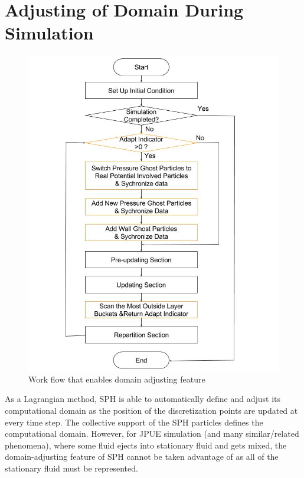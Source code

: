 \documentclass[conference,compsoc]{IEEEtran}
\begin{document}
\section{Adjusting of Domain During Simulation}
\begin{figure}[!t]
\centering
\includegraphics[scale=0.32]{Work_flow_adjust}
\caption{Work flow that enables domain adjusting feature}
\label{fig:Work_flow_adjust}
\end{figure}
As a Lagrangian method, SPH is able to automatically define and adjust its computational domain as the position of the discretization points are updated at every time step.  The 
collective support of the SPH particles defines the computational domain. However, for JPUE simulation (and many similar/related phenomena), where some fluid ejects into stationary fluid and gets mixed, the domain-adjusting feature of SPH cannot be taken advantage of as all of the stationary fluid must be represented. %
\end{document}
